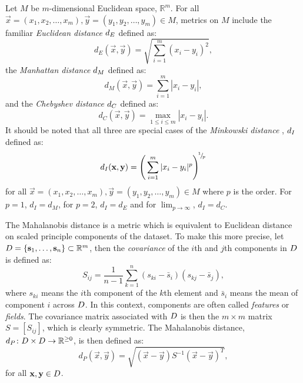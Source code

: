 Let $M$ be $m$-dimensional Euclidean space, $\mathbb{R}^m$.  For all
$\vec{x}=(x_1,x_2,\dotsc,x_m), \vec{y}=(y_1,y_2,\dotsc,y_m) \in M$, metrics on
$M$ include the familiar \textit{Euclidean distance} $d_{E}$ defined
as:
\begin{equation*}
  d_E(\vec{x},\vec{y}) = \sqrt{\sum_{i=1}^{m} (x_i - y_i)^2},
\end{equation*}
the \textit{Manhattan distance} $d_{M}$ defined as:
\begin{equation*}
  d_{M}(\vec{x},\vec{y}) = \sum_{i=1}^{m} |x_i - y_i|,
\end{equation*}
and the \textit{Chebyshev distance} $d_{C}$ defined as:
\begin{equation*}
  d_C(\vec{x},\vec{y}) = \max_{1 \leq i \leq m} |x_i - y_i|.
\end{equation*}
It should be noted that all three are special cases of the \textit{Minkowski
  distance} \citep{deza2009encyclopedia}, $d_{I}$ defined as:
\begin{equation*}
  d_{I}(\mathbf{x},\mathbf{y}) = \left(\,\sum_{i=1}^{m} |x_i - y_i|^{p}\right)^{\!^1\!/\!_p}
\end{equation*}
for all $\vec{x}=(x_1,x_2,\dotsc,x_m), \vec{y}=(y_1,y_2,\dotsc,y_m) \in M$
where $p$ is the order.  For $p=1$, $d_I=d_M$, for $p=2$, $d_I=d_E$ and for
$\lim_{p \to \infty}$, $d_I=d_C$.

The Mahalanobis distance \citep{mahalanobis30distance} is a metric which is
equivalent to Euclidean distance on scaled principle components of the
dataset.  To make this more precise, let $D =
\{\mathbf{s}_1,\dotsc,\mathbf{s}_n\} \subset \mathbb{R}^m$, then the
\textit{covariance} of the $i$th and $j$th components in $D$ is defined
as:
\begin{equation*}
  S_{ij} = \frac{1}{n-1} \sum_{k=1}^{n} (s_{ki}-\bar{s}_i)(s_{kj}-\bar{s}_j),
\end{equation*}
where $s_{ki}$ means the $i$th component of the $k$th element and $\bar{s}_i$
means the mean of component $i$ across $D$.  In this context, components
are often called \textit{features} or \textit{fields}.  The covariance matrix
associated with $D$ is then the $m \times m$ matrix $S = [S_{ij}]$, which
is clearly symmetric.  The Mahalanobis distance, $d_{P} \colon D \times
D \to \mathbb{R}^{\geq 0}$, is then defined as:
\begin{equation*}
  d_{P}(\vec{x},\vec{y}) = \sqrt{(\vec{x}-\vec{y})S^{-1}(\vec{x}-\vec{y})^T},
\end{equation*}
for all $\mathbf{x},\mathbf{y} \in D$.

